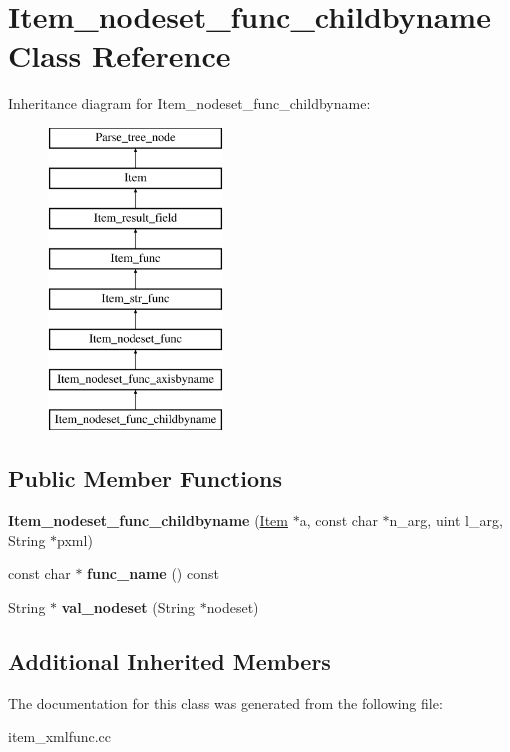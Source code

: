 \hypertarget{classItem__nodeset__func__childbyname}{}\section{Item\+\_\+nodeset\+\_\+func\+\_\+childbyname Class Reference}
\label{classItem__nodeset__func__childbyname}
Inheritance diagram for Item\+\_\+nodeset\+\_\+func\+\_\+childbyname\+:\begin{figure}[H]
\begin{center}
\leavevmode
\includegraphics[height=8.000000cm]{classItem__nodeset__func__childbyname}
\end{center}
\end{figure}
\subsection*{Public Member Functions}
\begin{DoxyCompactItemize}
\item 
\mbox{\label{classItem__nodeset__func__childbyname_a3bb564b6ac850546262fa1ee96919bf8}} 
{\bfseries Item\+\_\+nodeset\+\_\+func\+\_\+childbyname} (\mbox{\hyperlink{classItem}{Item}} $\ast$a, const char $\ast$n\+\_\+arg, uint l\+\_\+arg, String $\ast$pxml)
\item 
\mbox{\label{classItem__nodeset__func__childbyname_a916388c714562cd96e58aa8c75e251b5}} 
const char $\ast$ {\bfseries func\+\_\+name} () const
\item 
\mbox{\label{classItem__nodeset__func__childbyname_af0d88972390126c7ec9827fdf17b58c3}} 
String $\ast$ {\bfseries val\+\_\+nodeset} (String $\ast$nodeset)
\end{DoxyCompactItemize}
\subsection*{Additional Inherited Members}


The documentation for this class was generated from the following file\+:\begin{DoxyCompactItemize}
\item 
item\+\_\+xmlfunc.\+cc\end{DoxyCompactItemize}
